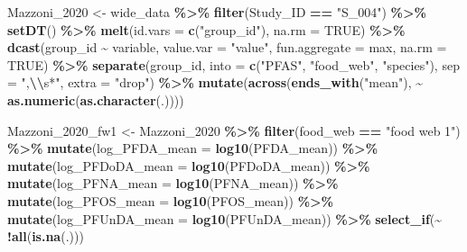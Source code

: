 \documentclass[
]{article}
\newenvironment{Shaded}{\begin{snugshade}}{\end{snugshade}}
\newcommand{\AttributeTok}[1]{\textcolor[rgb]{0.13,0.29,0.53}{#1}}
\newcommand{\ConstantTok}[1]{\textcolor[rgb]{0.56,0.35,0.01}{#1}}
\newcommand{\FunctionTok}[1]{\textcolor[rgb]{0.13,0.29,0.53}{\textbf{#1}}}
\newcommand{\NormalTok}[1]{#1}
\newcommand{\OtherTok}[1]{\textcolor[rgb]{0.56,0.35,0.01}{#1}}
\newcommand{\SpecialCharTok}[1]{\textcolor[rgb]{0.81,0.36,0.00}{\textbf{#1}}}
\newcommand{\StringTok}[1]{\textcolor[rgb]{0.31,0.60,0.02}{#1}}
\begin{document}
\begin{Shaded}
\begin{Highlighting}[]
\NormalTok{Mazzoni\_2020 }\OtherTok{\textless{}{-}}\NormalTok{ wide\_data }\SpecialCharTok{\%\textgreater{}\%} 
  \FunctionTok{filter}\NormalTok{(Study\_ID }\SpecialCharTok{==} \StringTok{"S\_004"}\NormalTok{) }\SpecialCharTok{\%\textgreater{}\%}
  \FunctionTok{setDT}\NormalTok{() }\SpecialCharTok{\%\textgreater{}\%} 
  \FunctionTok{melt}\NormalTok{(}\AttributeTok{id.vars =} \FunctionTok{c}\NormalTok{(}\StringTok{"group\_id"}\NormalTok{), }\AttributeTok{na.rm =} \ConstantTok{TRUE}\NormalTok{) }\SpecialCharTok{\%\textgreater{}\%} 
  \FunctionTok{dcast}\NormalTok{(group\_id }\SpecialCharTok{\textasciitilde{}}\NormalTok{ variable, }\AttributeTok{value.var =} \StringTok{"value"}\NormalTok{, }\AttributeTok{fun.aggregate =}\NormalTok{ max, }\AttributeTok{na.rm =} \ConstantTok{TRUE}\NormalTok{) }\SpecialCharTok{\%\textgreater{}\%} 
  \FunctionTok{separate}\NormalTok{(group\_id, }\AttributeTok{into =} \FunctionTok{c}\NormalTok{(}\StringTok{"PFAS"}\NormalTok{, }\StringTok{"food\_web"}\NormalTok{, }\StringTok{"species"}\NormalTok{), }\AttributeTok{sep =} \StringTok{",}\SpecialCharTok{\textbackslash{}\textbackslash{}}\StringTok{s*"}\NormalTok{, }\AttributeTok{extra =} \StringTok{"drop"}\NormalTok{) }\SpecialCharTok{\%\textgreater{}\%} 
  \FunctionTok{mutate}\NormalTok{(}\FunctionTok{across}\NormalTok{(}\FunctionTok{ends\_with}\NormalTok{(}\StringTok{"mean"}\NormalTok{), }\SpecialCharTok{\textasciitilde{}} \FunctionTok{as.numeric}\NormalTok{(}\FunctionTok{as.character}\NormalTok{(.))))}

\NormalTok{Mazzoni\_2020\_fw1 }\OtherTok{\textless{}{-}}\NormalTok{ Mazzoni\_2020 }\SpecialCharTok{\%\textgreater{}\%} 
  \FunctionTok{filter}\NormalTok{(food\_web }\SpecialCharTok{==} \StringTok{"food web 1"}\NormalTok{) }\SpecialCharTok{\%\textgreater{}\%}
  \FunctionTok{mutate}\NormalTok{(}\AttributeTok{log\_PFDA\_mean =} \FunctionTok{log10}\NormalTok{(PFDA\_mean)) }\SpecialCharTok{\%\textgreater{}\%}
  \FunctionTok{mutate}\NormalTok{(}\AttributeTok{log\_PFDoDA\_mean =} \FunctionTok{log10}\NormalTok{(PFDoDA\_mean)) }\SpecialCharTok{\%\textgreater{}\%}
  \FunctionTok{mutate}\NormalTok{(}\AttributeTok{log\_PFNA\_mean =} \FunctionTok{log10}\NormalTok{(PFNA\_mean)) }\SpecialCharTok{\%\textgreater{}\%}
  \FunctionTok{mutate}\NormalTok{(}\AttributeTok{log\_PFOS\_mean =} \FunctionTok{log10}\NormalTok{(PFOS\_mean)) }\SpecialCharTok{\%\textgreater{}\%}
  \FunctionTok{mutate}\NormalTok{(}\AttributeTok{log\_PFUnDA\_mean =} \FunctionTok{log10}\NormalTok{(PFUnDA\_mean)) }\SpecialCharTok{\%\textgreater{}\%}
  \FunctionTok{select\_if}\NormalTok{(}\SpecialCharTok{\textasciitilde{}} \SpecialCharTok{!}\FunctionTok{all}\NormalTok{(}\FunctionTok{is.na}\NormalTok{(.)))}


\end{Highlighting}
\end{Shaded}
\end{document}
